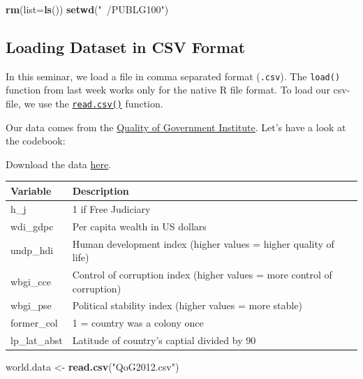 \documentclass[]{book}
\newenvironment{Shaded}{\begin{snugshade}}{\end{snugshade}}
\newcommand{\KeywordTok}[1]{\textcolor[rgb]{0.13,0.29,0.53}{\textbf{#1}}}
\newcommand{\DataTypeTok}[1]{\textcolor[rgb]{0.13,0.29,0.53}{#1}}
\newcommand{\StringTok}[1]{\textcolor[rgb]{0.31,0.60,0.02}{#1}}
\newcommand{\NormalTok}[1]{#1}
\theoremstyle{definition}
\theoremstyle{definition}
\theoremstyle{definition}
\theoremstyle{remark}
\begin{document}
\begin{Shaded}
\begin{Highlighting}[]
\KeywordTok{rm}\NormalTok{(}\DataTypeTok{list=}\KeywordTok{ls}\NormalTok{())}
\KeywordTok{setwd}\NormalTok{(}\StringTok{"~/PUBLG100"}\NormalTok{)}
\end{Highlighting}
\end{Shaded}

\subsection{Loading Dataset in CSV
Format}\label{loading-dataset-in-csv-format}

In this seminar, we load a file in comma separated format
(\texttt{.csv}). The \texttt{load()} function from last week works only
for the native R file format. To load our csv-file, we use the
\href{https://stat.ethz.ch/R-manual/R-devel/library/utils/html/read.table.html}{\texttt{read.csv()}}
function.

Our data comes from the \href{http://qog.pol.gu.se/}{Quality of
Government Institute}. Let's have a look at the codebook:

Download the data
\href{https://github.com/philippbroniecki/statistics1/tree/master/docs/QoG2012.csv}{here}.

\begin{tabular}{l|l}
\hline
Variable & Description\\
\hline
h\_j & 1 if Free Judiciary\\
\hline
wdi\_gdpc & Per capita wealth in US dollars\\
\hline
undp\_hdi & Human development index (higher values = higher quality of life)\\
\hline
wbgi\_cce & Control of corruption index (higher values = more control of corruption)\\
\hline
wbgi\_pse & Political stability index (higher values = more stable)\\
\hline
former\_col & 1 = country was a colony once\\
\hline
lp\_lat\_abst & Latitude of country's captial divided by 90\\
\hline
\end{tabular}

\begin{Shaded}
\begin{Highlighting}[]
\NormalTok{world.data <-}\StringTok{ }\KeywordTok{read.csv}\NormalTok{(}\StringTok{"QoG2012.csv"}\NormalTok{)}
\end{Highlighting}
\end{Shaded}
\end{document}
